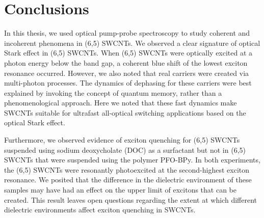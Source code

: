 \chapter{Conclusions}

In this thesis, we used optical pump-probe spectroscopy to study coherent and incoherent phenomena in (6,5) SWCNTs. We observed a clear signature of optical Stark effect in (6,5) SWCNTs. When (6,5) SWCNTs were optically excited at a photon energy below the band gap, a coherent blue shift of the lowest exciton resonance occurred. However, we also noted that real carriers were created via multi-photon processes. The dynamics of dephasing for these carriers were best explained by invoking the concept of quantum memory, rather than a phenomenological approach. Here we noted that these fast dynamics make SWCNTs suitable for ultrafast all-optical switching applications based on the optical Stark effect.

Furthermore, we observed evidence of exciton quenching for (6,5) SWCNTs suspended using sodium deoxycholate (DOC) as a surfactant but not in (6,5) SWCNTs that were suspended using the polymer PFO-BPy. In both experiments, the (6,5) SWCNTs were resonantly photoexcited at the second-highest exciton resonance. We posited that the difference in the dielectric environment of these samples may have had an effect on the upper limit of excitons that can be created. This result leaves open questions regarding the extent at which different dielectric environments affect exciton quenching in SWCNTs. 
